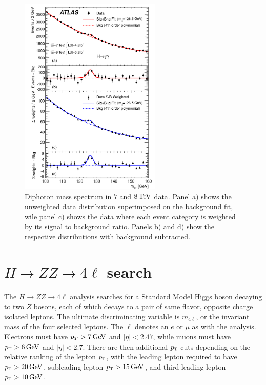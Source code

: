 \begin{figure}[h!]
  \centering
  \captionsetup{justification=centering}
  \includegraphics[width=0.6\textwidth]{figures/discovery_mgg}
  \caption{Diphoton mass spectrum in $7$ and $8 \TeV$ data. Panel a) shows the unweighted data distribution superimposed on the background fit, wile panel c) shows the data where each event category is weighted by its signal to background ratio. Panels b) and d) show the respective distributions with background subtracted\cite{Discovery}.}
  \label{fig:disc_mgg}
\end{figure}

\section{$H\to ZZ \to 4\ell$ search}

The $H\to ZZ \to 4\ell$ analysis searches for a Standard Model Higgs boson decaying to two $Z$ bosons, each of which decays to a pair of same flavor, opposite charge isolated leptons. The ultimate discriminating variable is $m_{4\ell}$, or the invariant mass of the four selected leptons. The $\ell$ denotes an $e$ or $\mu$ as with the \HWWfull analysis. Electrons must have $p_{T} > 7 \GeV$ and $|\eta| < 2.47$, while muons must have $\pT > 6 \GeV$ and $|\eta| < 2.7$. There are then additional $p_{\textrm{\footnotesize\sc t}}$ cuts depending on the relative ranking of the lepton $p_{\textrm{\footnotesize\sc t}}$, with the leading lepton required to have $\pT > 20 \GeV$, subleading lepton $\pT > 15 \GeV$, and third leading lepton $\pT > 10 \GeV$. 

